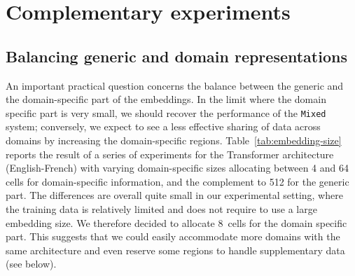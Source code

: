 \section{Complementary experiments\label{sec:Discussion}}

\subsection{Balancing generic and domain representations\label{secc:region_size}}

An important practical question concerns the balance between the generic and the domain-specific part of the embeddings. 
In the limit where the domain specific part is very small, we should recover the performance of the \texttt{Mixed} system; 
conversely, we expect to see a less effective sharing of data across domains by increasing the domain-specific regions. 
Table~\ref{tab:embedding-size} reports the result of  a series of experiments for the Transformer architecture (English-French) with varying domain-specific sizes allocating between 4 and 64 cells for domain-specific information, and the complement to 512 for the generic part. 
The differences are overall quite small in our experimental setting, where the training data is relatively limited and does not require to use a large embedding size. 
We therefore decided to allocate $8$~cells for the domain specific part. 
This suggests that we could easily accommodate more domains with the same architecture and even reserve some regions to handle supplementary data (see below). %

\begin{table}[!h]
\begin{center}
\end{center}
\caption{BLEU scores for the Transformer architecture for varying domain-specific embedding sizes \label{tab:embedding-size}}
\end{table}

